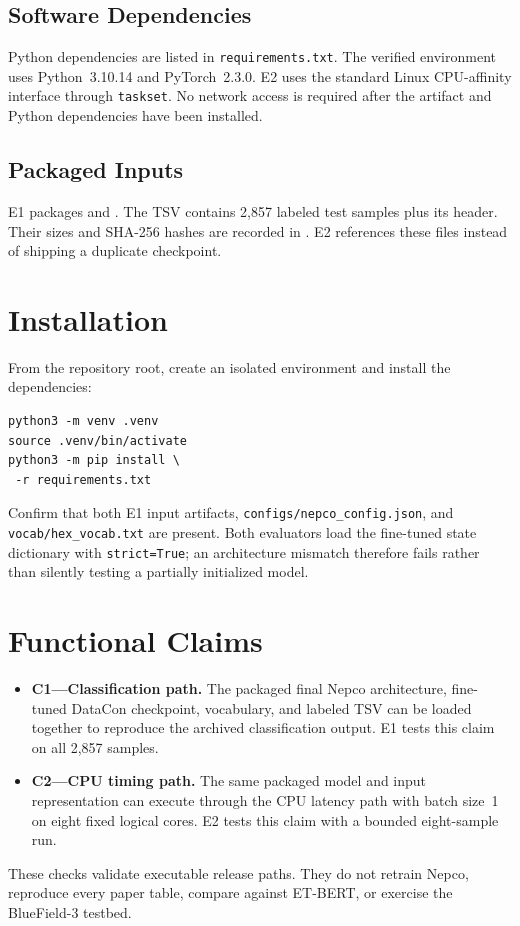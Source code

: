 \documentclass[10pt,letterpaper,twocolumn]{article}
\begin{document}
\subsection{Software Dependencies}
Python dependencies are listed in \texttt{requirements.txt}. The verified environment uses Python~3.10.14 and PyTorch~2.3.0. E2 uses the standard Linux CPU-affinity interface through \texttt{taskset}. No network access is required after the artifact and Python dependencies have been installed.

\subsection{Packaged Inputs}
E1 packages  and . The TSV contains 2,857 labeled test samples plus its header. Their sizes and SHA-256 hashes are recorded in . E2 references these files instead of shipping a duplicate checkpoint.

\section{Installation}
From the repository root, create an isolated environment and install the dependencies:
\begin{verbatim}
python3 -m venv .venv
source .venv/bin/activate
python3 -m pip install \
 -r requirements.txt
\end{verbatim}
Confirm that both E1 input artifacts, \texttt{configs/nepco\_config.json}, and \texttt{vocab/hex\_vocab.txt} are present. Both evaluators load the fine-tuned state dictionary with \texttt{strict=True}; an architecture mismatch therefore fails rather than silently testing a partially initialized model.

\section{Functional Claims}
\begin{itemize}
\item \textbf{C1---Classification path.} The packaged final Nepco architecture, fine-tuned DataCon checkpoint, vocabulary, and labeled TSV can be loaded together to reproduce the archived classification output. E1 tests this claim on all 2,857 samples.
\item \textbf{C2---CPU timing path.} The same packaged model and input representation can execute through the CPU latency path with batch size~1 on eight fixed logical cores. E2 tests this claim with a bounded eight-sample run.
\end{itemize}
These checks validate executable release paths. They do not retrain Nepco, reproduce every paper table, compare against ET-BERT, or exercise the BlueField-3 testbed.
\end{document}
